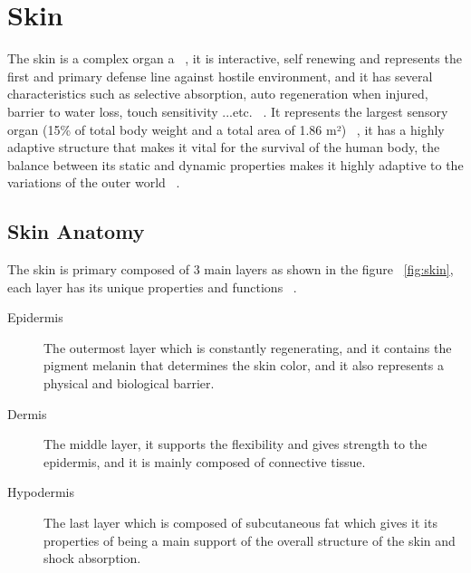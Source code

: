 \section{Skin}
The skin is a complex organ a ~\cite{elin2018}, it is interactive, self renewing and represents the first and primary defense line against hostile environment, and it has several characteristics such as selective absorption, auto regeneration when injured, barrier to water loss, touch sensitivity ...etc. ~\cite{joseph2020}. It represents the largest sensory organ (15\% of total body weight and a total area of 1.86 m²) ~\cite{sarah2021}, it has a highly adaptive structure that makes it vital for the survival of the human body, the balance between its static and dynamic properties makes it highly adaptive to the variations of the outer world ~\cite{eliana2022}.

\subsection{Skin Anatomy}
The skin is primary composed of 3 main layers as shown in the figure ~\ref{fig:skin}, each layer has its unique properties and functions ~\cite{sarah2021}.
\begin{description}
\item[Epidermis] The outermost layer which is constantly regenerating, and it contains the pigment melanin that determines the skin color, and it also represents a physical and biological barrier.
\item[Dermis] The middle layer, it supports the flexibility and gives strength to the epidermis, and it is mainly composed of connective tissue.
\item[Hypodermis] The last layer which is composed of subcutaneous fat which gives it its properties of being a main support of the overall structure of the skin and shock absorption.
\end{description}

